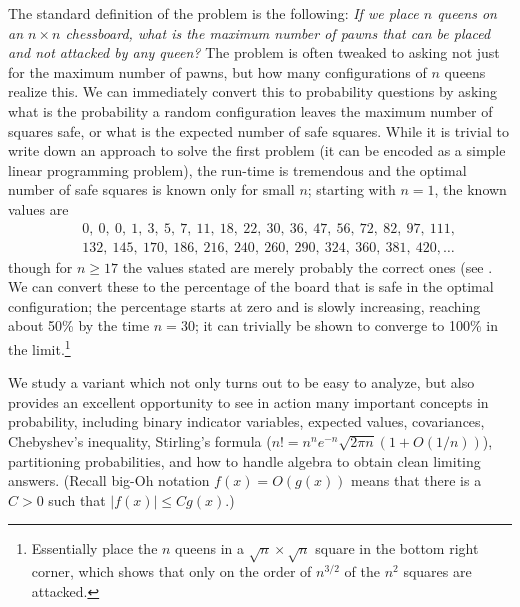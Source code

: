 \documentclass[12pt,reqno]{amsart}
\numberwithin{equation}{section}
\theoremstyle{plain}
\begin{document}
The standard definition of the problem is the following: \emph{If we place $n$ queens on an $n\times n$ chessboard, what is the maximum number of pawns that can be placed and not attacked by any queen?} The problem is often tweaked to asking not just for the maximum number of pawns, but how many configurations of $n$ queens realize this. We can immediately convert this to probability questions by asking what is the probability a random configuration leaves the maximum number of squares safe, or what is the expected number of safe squares. While it is trivial to write down an approach to solve the first problem (it can be encoded as a simple linear programming problem), the run-time is tremendous and the optimal number of safe squares is known only for small $n$; starting with $n=1$, the known values are \begin{eqnarray} & &	0,\  0,\  0,\  1,\  3,\  5,\  7,\  11,\  18,\  22,\  30,\  36,\  47,\  56,\  72,\  82,\  97,\  111,\  \nonumber\\ & &  132,\ 145,\  170,\  186,\  216,\  240,\  260,\  290,\  324,\  360,\  381,\  420, \dots\end{eqnarray} though for $n \ge 17$ the values stated are merely probably the correct ones (see \cite{LV1, LV2, OEIS}. We can convert these to the percentage of the board that is safe in the optimal configuration; the percentage starts at zero and is slowly increasing, reaching about 50\% by the time $n=30$; it can trivially be shown to converge to 100\% in the limit.\footnote{Essentially place the $n$ queens in a $\sqrt{n} \times \sqrt{n}$ square in the bottom right corner, which shows that only on the order of $n^{3/2}$ of the $n^2$ squares are attacked.}


We study a variant which not only turns out to be easy to analyze, but also provides an excellent opportunity to see in action many important concepts in probability, including binary indicator variables, expected values, covariances, Chebyshev's inequality, Stirling's formula ($n! = n^n e^{-n} \sqrt{2\pi n} \left(1 + O(1/n)\right)$), partitioning probabilities, and how to handle algebra to obtain clean limiting answers. (Recall big-Oh notation $f(x) = O(g(x))$ means that there is a $C > 0$ such that $|f(x)| \le C g(x)$.)
\end{document}
